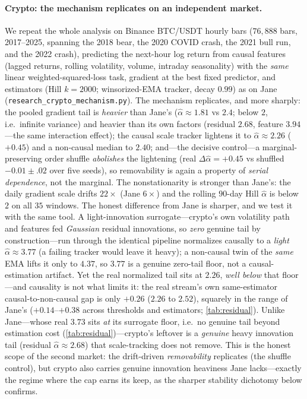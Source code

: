 \documentclass{article}
\begin{document}
\paragraph{Crypto: the mechanism replicates on an independent market.} We repeat the whole
analysis on Binance BTC/USDT hourly bars ($76{,}888$ bars, 2017--2025, spanning the 2018 bear,
the 2020 COVID crash, the 2021 bull run, and the 2022 crash), predicting the next-hour log return
from causal features (lagged returns, rolling volatility, volume, intraday seasonality) with the
\emph{same} linear weighted-squared-loss task, gradient at the best fixed predictor, and
estimators (Hill $k{=}2000$; winsorized-EMA tracker, decay $0.99$) as on Jane
(\texttt{research\_crypto\_mechanism.py}). The mechanism replicates, and more sharply: the pooled
gradient tail is \emph{heavier} than Jane's ($\hat\alpha\approx1.81$ vs $2.4$; below $2$, i.e.\
infinite variance) and heavier than its own factors (residual $2.68$, feature $3.94$---the same
interaction effect); the causal scale tracker lightens it to $\hat\alpha\approx2.26$ ($+0.45$)
and a non-causal median to $2.40$; and---the decisive control---a marginal-preserving order
shuffle \emph{abolishes} the lightening (real $\Delta\hat\alpha={+}0.45$ vs shuffled
${-}0.01\!\pm\!.02$ over five seeds), so removability is again a property of \emph{serial
dependence}, not the marginal. The nonstationarity is stronger than Jane's: the daily gradient
scale drifts $22\times$ (Jane $6\times$) and the rolling $90$-day Hill $\hat\alpha$ is below $2$
on all $35$ windows. The honest difference from Jane is sharper, and we test it with the same
tool. A light-innovation surrogate---crypto's own volatility path and features fed \emph{Gaussian}
residual innovations, so \emph{zero} genuine tail by construction---run through the identical
pipeline normalizes causally to a \emph{light} $\hat\alpha\approx3.77$ (a failing tracker would
leave it heavy); a non-causal twin of the \emph{same} EMA lifts it only to $4.37$, so $3.77$ is a
genuine zero-tail floor, not a causal-estimation artifact. Yet the real normalized tail sits at
$2.26$, \emph{well below} that floor---and causality is not what limits it: the real stream's own
same-estimator causal-to-non-causal gap is only $+0.26$ ($2.26$ to $2.52$), squarely in the range
of Jane's ($+0.14$--$+0.38$ across thresholds and estimators; \cref{tab:residual}). Unlike
Jane---whose real $3.73$ sits \emph{at} its surrogate floor, i.e.\ no genuine tail beyond
estimation cost (\cref{tab:residual})---crypto's leftover is a \emph{genuine} heavy innovation
tail (residual $\hat\alpha\approx2.68$) that scale-tracking does not remove. This is the honest
scope of the second market: the drift-driven \emph{removability} replicates (the shuffle control),
but crypto also carries genuine innovation heaviness Jane lacks---exactly the regime where the cap
earns its keep, as the sharper stability dichotomy below confirms.
\end{document}
